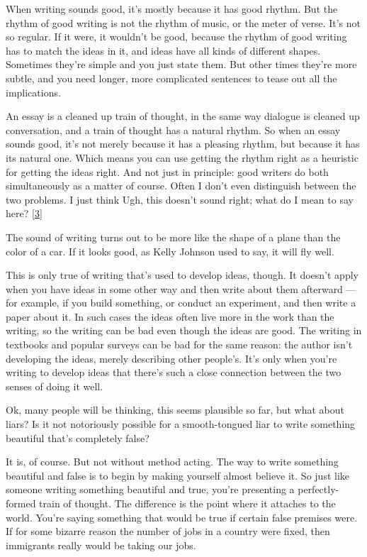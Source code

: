When writing sounds good, it's mostly because it has good
rhythm. But the rhythm of good writing is not the rhythm
of music, or the meter of verse. It's not so regular. If
it were, it wouldn't be good, because the rhythm of good
writing has to match the ideas in it, and ideas have all
kinds of different shapes. Sometimes they're simple and
you just state them. But other times they're more subtle,
and you need longer, more complicated sentences to tease
out all the implications.

An essay is a cleaned up train of thought, in the same
way dialogue is cleaned up conversation, and a train of
thought has a natural rhythm. So when an essay sounds
good, it's not merely because it has a pleasing rhythm,
but because it has its natural one. Which means you can
use getting the rhythm right as a heuristic for getting
the ideas right. And not just in principle: good writers
do both simultaneously as a matter of course. Often I
don't even distinguish between the two problems. I just
think Ugh, this doesn't sound right; what do I mean to
say here?
[\href{\#f3n}{3}]

The sound of writing turns out to be more like the shape
of a plane than the color of a car. If it looks good, as
Kelly Johnson used to say, it will fly well.

This is only true of writing that's used to develop
ideas, though. It doesn't apply when you have ideas in
some other way and then write about them afterward --- for
example, if you build something, or conduct an
experiment, and then write a paper about it. In such
cases the ideas often live more in the work than the
writing, so the writing can be bad even though the ideas
are good. The writing in textbooks and popular surveys
can be bad for the same reason: the author isn't
developing the ideas, merely describing other people's.
It's only when you're writing to develop ideas that
there's such a close connection between the two senses of
doing it well.

Ok, many people will be thinking, this seems plausible so
far, but what about liars? Is it not notoriously possible
for a smooth-tongued liar to write something beautiful
that's completely false?

It is, of course. But not without method acting. The way
to write something beautiful and false is to begin by
making yourself almost believe it. So just like someone
writing something beautiful and true, you're presenting a
perfectly-formed train of thought. The difference is the
point where it attaches to the world. You're saying
something that would be true if certain false premises
were. If for some bizarre reason the number of jobs in a
country were fixed, then immigrants really would be
taking our jobs.

